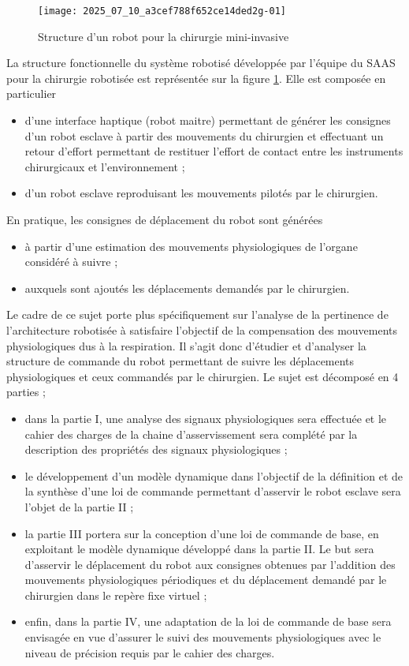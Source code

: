 \begin{figure}[!h]
\texttt{[image: 2025\_07\_10\_a3cef788f652ce14ded2g-01]}
\centering
\caption{Structure d'un robot pour la chirurgie mini-invasive\label{ccs_psi_2019_fig_01}}
\end{figure}

La structure fonctionnelle du système robotisé développée par l'équipe du SAAS pour la chirurgie robotisée est représentée sur la figure \ref{ccs_psi_2019_fig_01}. Elle est composée en particulier

\begin{itemize}
  \item d'une interface haptique (robot maitre) permettant de générer les consignes d'un robot esclave à partir des mouvements du chirurgien et effectuant un retour d'effort permettant de restituer l'effort de contact entre les instruments chirurgicaux et l'environnement ;
  \item d'un robot esclave reproduisant les mouvements pilotés par le chirurgien.
\end{itemize}

En pratique, les consignes de déplacement du robot sont générées

\begin{itemize}
  \item à partir d'une estimation des mouvements physiologiques de l'organe considéré à suivre ;
  \item auxquels sont ajoutés les déplacements demandés par le chirurgien.
\end{itemize}

Le cadre de ce sujet porte plus spécifiquement sur l'analyse de la pertinence de l'architecture robotisée à satisfaire l'objectif de la compensation des mouvements physiologiques dus à la respiration. Il s'agit donc d'étudier et d'analyser la structure de commande du robot permettant de suivre les déplacements physiologiques et ceux commandés par le chirurgien. Le sujet est décomposé en 4 parties ;

\begin{itemize}
  \item dans la partie I, une analyse des signaux physiologiques sera effectuée et le cahier des charges de la chaine d'asservissement sera complété par la description des propriétés des signaux physiologiques ;
  \item le développement d'un modèle dynamique dans l'objectif de la définition et de la synthèse d'une loi de commande permettant d'asservir le robot esclave sera l'objet de la partie II ;
  \item la partie III portera sur la conception d'une loi de commande de base, en exploitant le modèle dynamique développé dans la partie II. Le but sera d'asservir le déplacement du robot aux consignes obtenues par l'addition des mouvements physiologiques périodiques et du déplacement demandé par le chirurgien dans le repère fixe virtuel ;
  \item enfin, dans la partie IV, une adaptation de la loi de commande de base sera envisagée en vue d'assurer le suivi des mouvements physiologiques avec le niveau de précision requis par le cahier des charges.
\end{itemize}


